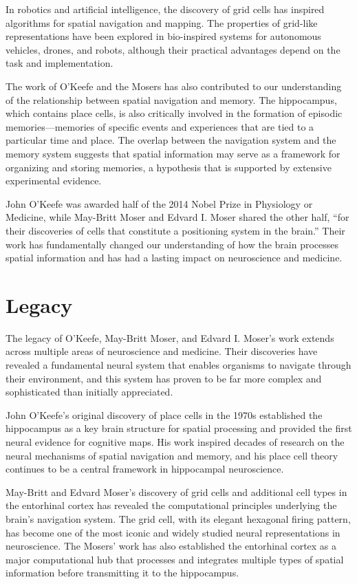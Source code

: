 In robotics and artificial intelligence, the discovery of grid cells has inspired algorithms for spatial navigation and mapping. The properties of grid-like representations have been explored in bio-inspired systems for autonomous vehicles, drones, and robots, although their practical advantages depend on the task and implementation.

The work of O'Keefe and the Mosers has also contributed to our understanding of the relationship between spatial navigation and memory. The hippocampus, which contains place cells, is also critically involved in the formation of episodic memories---memories of specific events and experiences that are tied to a particular time and place. The overlap between the navigation system and the memory system suggests that spatial information may serve as a framework for organizing and storing memories, a hypothesis that is supported by extensive experimental evidence.

John O'Keefe was awarded half of the 2014 Nobel Prize in Physiology or Medicine, while May-Britt Moser and Edvard I. Moser shared the other half, ``for their discoveries of cells that constitute a positioning system in the brain.'' Their work has fundamentally changed our understanding of how the brain processes spatial information and has had a lasting impact on neuroscience and medicine.

\section{Legacy}

The legacy of O'Keefe, May-Britt Moser, and Edvard I. Moser's work extends across multiple areas of neuroscience and medicine. Their discoveries have revealed a fundamental neural system that enables organisms to navigate through their environment, and this system has proven to be far more complex and sophisticated than initially appreciated.

John O'Keefe's original discovery of place cells in the 1970s established the hippocampus as a key brain structure for spatial processing and provided the first neural evidence for cognitive maps. His work inspired decades of research on the neural mechanisms of spatial navigation and memory, and his place cell theory continues to be a central framework in hippocampal neuroscience.

May-Britt and Edvard Moser's discovery of grid cells and additional cell types in the entorhinal cortex has revealed the computational principles underlying the brain's navigation system. The grid cell, with its elegant hexagonal firing pattern, has become one of the most iconic and widely studied neural representations in neuroscience. The Mosers' work has also established the entorhinal cortex as a major computational hub that processes and integrates multiple types of spatial information before transmitting it to the hippocampus.

